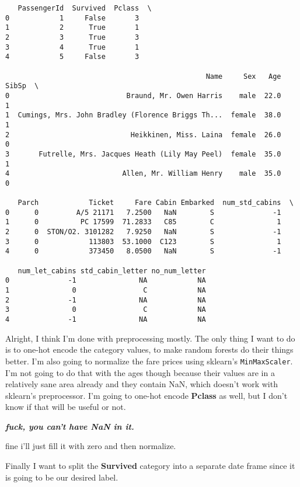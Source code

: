 \documentclass[11pt]{article}
\begin{document}
    
    \begin{verbatim}
   PassengerId  Survived  Pclass  \
0            1     False       3   
1            2      True       1   
2            3      True       3   
3            4      True       1   
4            5     False       3   

                                                Name     Sex   Age  SibSp  \
0                            Braund, Mr. Owen Harris    male  22.0      1   
1  Cumings, Mrs. John Bradley (Florence Briggs Th...  female  38.0      1   
2                             Heikkinen, Miss. Laina  female  26.0      0   
3       Futrelle, Mrs. Jacques Heath (Lily May Peel)  female  35.0      1   
4                           Allen, Mr. William Henry    male  35.0      0   

   Parch            Ticket     Fare Cabin Embarked  num_std_cabins  \
0      0         A/5 21171   7.2500   NaN        S              -1   
1      0          PC 17599  71.2833   C85        C               1   
2      0  STON/O2. 3101282   7.9250   NaN        S              -1   
3      0            113803  53.1000  C123        S               1   
4      0            373450   8.0500   NaN        S              -1   

   num_let_cabins std_cabin_letter no_num_letter  
0              -1               NA            NA  
1               0                C            NA  
2              -1               NA            NA  
3               0                C            NA  
4              -1               NA            NA  
    \end{verbatim}

    
    Alright, I think I'm done with preprocessing mostly. The only thing I
want to do is to one-hot encode the category values, to make random
forests do their things better. I'm also going to normalize the fare
prices using sklearn's \texttt{MinMaxScaler}. I'm not going to do that
with the ages though because their values are in a relatively sane area
already and they contain NaN, which doesn't work with sklearn's
preprocessor. I'm going to one-hot encode \textbf{Pclass} as well, but I
don't know if that will be useful or not.

\textbf{\emph{fuck, you can't have NaN in it.}}

fine i'll just fill it with zero and then normalize.

Finally I want to split the \textbf{Survived} category into a separate
date frame since it is going to be our desired label.
\end{document}
